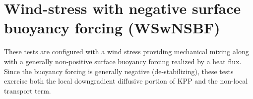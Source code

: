 \chapter{Wind-stress with negative surface buoyancy forcing
   (WSwNSBF)}

 These tests are configured with a wind stress providing mechanical
 mixing along with a generally non-positive surface buoyancy forcing
 realized by a heat flux.  Since the buoyancy forcing is generally
 negative (de-stabilizing), these tests exercise both the local
 downgradient diffusive portion of KPP and the non-local transport
 term.

\minitoc 
